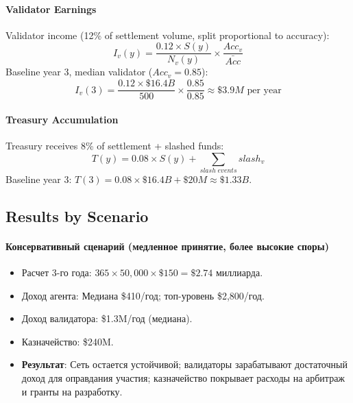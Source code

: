 \documentclass[11pt]{article}
\begin{document}
\paragraph{Validator Earnings} Validator income (12\% of settlement volume, split proportional to accuracy):
\begin{equation}
I_v(y) = \frac{0.12 \times S(y)}{N_v(y)} \times \frac{Acc_v}{\bar{Acc}}
\end{equation}
Baseline year 3, median validator ($Acc_v = 0.85$):
\begin{equation}
I_v(3) = \frac{0.12 \times \$16.4B}{500} \times \frac{0.85}{0.85} \approx \$3.9M \text{ per year}
\end{equation}

\paragraph{Treasury Accumulation} Treasury receives 8\% of settlement + slashed funds:
\begin{equation}
T(y) = 0.08 \times S(y) + \sum_{slash \; events} slash_v
\end{equation}
Baseline year 3: $T(3) = 0.08 \times \$16.4B + \$20M \approx \$1.33B$.

\subsection{Results by Scenario}
\paragraph{Консервативный сценарий (медленное принятие, более высокие споры)}
\begin{itemize}[noitemsep]
  \item Расчет 3-го года: $365 \times 50{,}000 \times \$150 = \$2.74$ миллиарда.
  \item Доход агента: Медиана \$410/год; топ-уровень \$2{,}800/год.
  \item Доход валидатора: \$1.3M/год (медиана).
  \item Казначейство: \$240M.
  \item \textbf{Результат}: Сеть остается устойчивой; валидаторы зарабатывают достаточный доход для оправдания участия; казначейство покрывает расходы на арбитраж и гранты на разработку.
\end{itemize}
\end{document}
